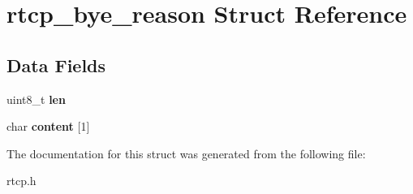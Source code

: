 \section{rtcp\+\_\+bye\+\_\+reason Struct Reference}
\label{structrtcp__bye__reason}
\subsection*{Data Fields}
\begin{DoxyCompactItemize}
\item 
\mbox{\label{structrtcp__bye__reason_abd9d481d4609b52d16b4ed1066b61485}} 
uint8\+\_\+t {\bfseries len}
\item 
\mbox{\label{structrtcp__bye__reason_a433db1fd331dd131bebb5df3d5f8f25c}} 
char {\bfseries content} [1]
\end{DoxyCompactItemize}


The documentation for this struct was generated from the following file\+:\begin{DoxyCompactItemize}
\item 
rtcp.\+h\end{DoxyCompactItemize}
